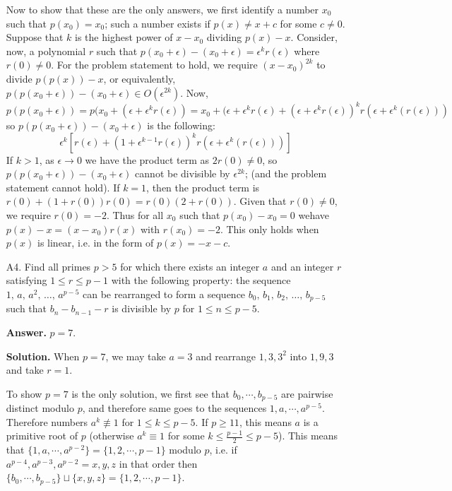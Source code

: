 \documentclass[11pt,a4paper]{article}
\begin{document}
\begin{enumerate}
		Now to show that these are the only answers, 
		we first identify a number $x_0$ such that $p(x_0) = x_0$; 
		such a number exists if $p(x)\neq x + c$ for some $c\neq 0$. 
		Suppose that $k$ is the highest power of $x-x_0$ dividing $p(x) - x$. 
		Consider, now, a polynomial $r$ such that $p(x_0 + \epsilon) - (x_0 + \epsilon) = \epsilon^kr(\epsilon)$ 
		where $r(0) \neq 0$. 
		For the problem statement to hold, we require $(x-x_0)^{2k}$ to divide $p(p(x)) - x$, 
		or equivalently, $p(p(x_0+\epsilon)) - (x_0 + \epsilon)\in O(\epsilon^{2k})$. 
		Now, 
		\[
		p(p(x_0 + \epsilon)) = p(x_0 + (\epsilon + \epsilon^kr(\epsilon))
		= x_0 + (\epsilon + \epsilon^kr(\epsilon) + (\epsilon + \epsilon^kr(\epsilon))^kr(\epsilon + \epsilon^k(r(\epsilon)))
		\]
		so $p(p(x_0 + \epsilon))  - (x_0+\epsilon)$ is the following: 
		\[\epsilon^k[r(\epsilon) + (1 + \epsilon^{k - 1}r(\epsilon))^kr(\epsilon + \epsilon^k(r(\epsilon)))]
		\]
		If $k > 1$, 
		as $\epsilon\to 0$ we have the product term as 
		$2r(0)\neq 0$, so $p(p(x_0 + \epsilon))  - (x_0+\epsilon)$ cannot be divisible by $\epsilon^{2k}$; 
		(and the problem statement cannot hold). 
		If $k = 1$, 
		then the product term is 
		$r(0) + (1 + r(0))r(0) = r(0)(2 + r(0))$. 
		Given that $r(0)\neq 0$, we require $r(0)=-2$. 
		Thus for all $x_0$ such that $p(x_0) - x_0 = 0$ wehave $p(x)-x = (x-x_0)r(x)$ with $r(x_0)=-2$. 
		This only holds when $p(x)$ is linear, i.e. in the form of $p(x)=-x-c$. 
		
		\item [A4.]
			Find all primes $p>5$ for which there exists an integer $a$ and an integer $r$ satisfying $1\leq r\leq p-1$ with the following property: the sequence $1,\,a,\,a^2,\,\ldots,\,a^{p-5}$ can be rearranged to form a sequence $b_0,\,b_1,\,b_2,\,\ldots,\,b_{p-5}$ such that $b_n-b_{n-1}-r$ is divisible by $p$ for $1\leq n\leq p-5$.
			
			\textbf{Answer.} $p = 7$. 
			
			\textbf{Solution.} 
			When $p = 7$, we may take $a = 3$ and rearrange $1, 3, 3^2$ into $1, 9, 3$ and take $r = 1$. 
			
			To show $p = 7$ is the only solution, we first see that $b_0, \cdots, b_{p - 5}$ are pairwise distinct modulo $p$, 
			and therefore same goes to the sequences $1, a, \cdots, a^{p - 5}$. 
			Therefore numbers $a^k\not\equiv 1$ for $1\le k\le p - 5$. If $p\ge 11$, this means $a$ is a primitive root of $p$ 
			(otherwise $a^k\equiv 1$ for some $k\le \frac{p-1}{2}\le p - 5$). 
			This means that $\{1, a, \cdots, a^{p - 2}\} = \{1, 2, \cdots, p - 1\}$ modulo $p$, 
			i.e. if $a^{p - 4}, a^{p - 3}, a^{p - 2} = x, y, z$ in that order then 
			$\{b_0, \cdots, b_{p - 5}\}\sqcup \{x, y, z\} = \{1, 2, \cdots, p - 1\}$. 
			

\end{enumerate}
\end{document}
